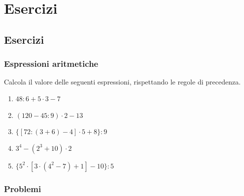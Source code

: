 
\chapter{Esercizi}
\section{Esercizi}

\subsection{Espressioni aritmetiche}

Calcola il valore delle seguenti espressioni, rispettando le regole
di precedenza.

\begin{enumerate}[label=\textbf{\arabic*.}, leftmargin=2em, itemsep=1.2ex]


      \item $48 : 6 + 5 \cdot 3 - 7$

      \item $(120 - 45 : 9) \cdot 2 - 13$

      \item $\{[72 : (3 + 6) - 4] \cdot 5 + 8\} : 9$


      \item $3^{4} - (2^{3} + 10) \cdot 2$

      \item $\{5^{2} \cdot [3 \cdot (4^{2} - 7) + 1] - 10\} : 5$

\end{enumerate}

\subsection*{Problemi}

